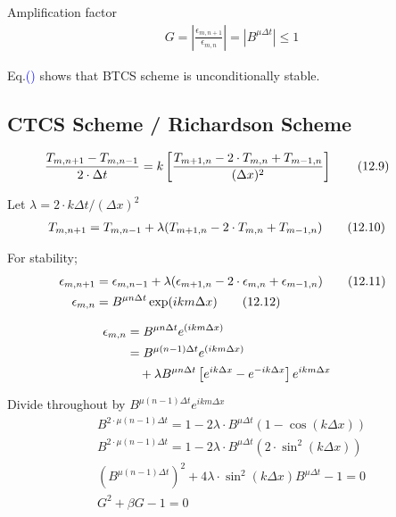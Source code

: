 \documentclass[fleqn,10pt]{SelfArx} %
\newcommand{\myeqref}[1]{Eq.\textcolor{blue}{\textup{(\getrefnumber{#1})}}}
\begin{document}
Amplification factor
\begin{align*}
	G = \left|\frac{\epsilon_{m,n+1}}{\epsilon_{m,n}}\right| = \left|B^{\mu \Delta t}\right| \leq 1 \tag{12.8} \label{eq:12.8}
\end{align*}

\myeqref{eq:12.8} shows that BTCS scheme is unconditionally stable.

\subsection{CTCS Scheme / Richardson Scheme}
\begin{align*}
	\mspace{-25mu} \frac{T_{m,n+1} - T_{m,n-1}}{2\cdot\Delta t} &= k\left[\frac{T_{m+1,n} - 2\cdot T_{m,n} + T_{m-1,n}}{(\Delta x)^2}\right] \tag{12.9} \label{eq:ctcs}
\end{align*}

Let $\lambda = 2\cdot k\Delta t/(\Delta x)^2$
\begin{align*}
	\mspace{-25mu} T_{m,n+1} &= T_{m,n-1} + \lambda(T_{m+1,n} - 2\cdot T_{m,n} + T_{m-1,n}) \tag{12.10} \label{12.10}
\end{align*}

For stability;
\begin{align*}
	\mspace{-25mu} \epsilon_{m,n+1} &= \epsilon_{m,n-1} + \lambda(\epsilon_{m+1,n}-2\cdot\epsilon_{m,n} + \epsilon_{m-1,n}) \tag{12.11} \label{eq:12.11} \\
	\mspace{-25mu} \epsilon_{m,n} &= B^{\mu n\Delta t}\exp(ikm\Delta x) \tag{12.12} \label{eq:12.12}
\end{align*}

\begin{align*}
	\mspace{-25mu} \epsilon_{m,n} &= B^{\mu n\Delta t}e^{(ikm\Delta x)} \\
	\mspace{-25mu} 	       &= B^{\mu (n-1)\Delta t}e^{(ikm\Delta x)} & \\ &\quad + \lambda B^{\mu n \Delta t}\left[e^{ik\Delta x} - e^{-ik\Delta x}\right]e^{ikm\Delta x}
\end{align*}

Divide throughout by $B^{\mu(n-1)\Delta t} e^{ikm\Delta x}$
\begin{align*}
	B^{2\cdot\mu(n-1)\Delta t} = 1 -2\lambda \cdot B^{\mu \Delta t}\left(1-\cos(k\Delta x)\right) \\
	B^{2\cdot\mu(n-1)\Delta t} = 1 -2\lambda \cdot B^{\mu \Delta t}\left(2\cdot\sin^2(k\Delta x)\right) \\
	\left(B^{\mu(n-1)\Delta t}\right)^2 + 4\lambda \cdot \sin^2(k\Delta x)B^{\mu \Delta t} - 1 = 0 \\
	G^2 + \beta G -1 = 0 \tag{12.13} \label{eq:12.13}
\end{align*}
\end{document}

